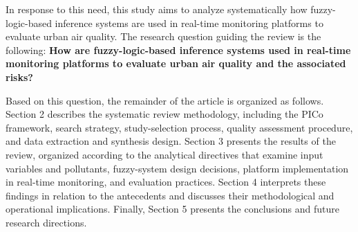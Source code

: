 In response to this need, this study aims to analyze systematically how fuzzy-logic-based inference systems are used in real-time monitoring platforms to evaluate urban air quality. The research question guiding the review is the following: \textbf{How are fuzzy-logic-based inference systems used in real-time monitoring platforms to evaluate urban air quality and the associated risks?}

Based on this question, the remainder of the article is organized as follows. Section 2 describes the systematic review methodology, including the PICo framework, search strategy, study-selection process, quality assessment procedure, and data extraction and synthesis design. Section 3 presents the results of the review, organized according to the analytical directives that examine input variables and pollutants, fuzzy-system design decisions, platform implementation in real-time monitoring, and evaluation practices. Section 4 interprets these findings in relation to the antecedents and discusses their methodological and operational implications. Finally, Section 5 presents the conclusions and future research directions.

